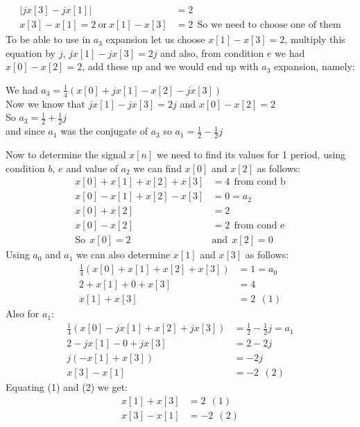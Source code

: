 \documentclass[10pt,a4paper, margin=1in]{article}
\begin{document}
\begin{enumerate}
\begin{align*}
			|jx[3] - jx[1]| &= 2 \\
			x[3] - x[1] = 2 \ \text{or} \ x[1] - x[3] &= 2 \ \ \text{So we need to choose one of them}
		\end{align*}
		To be able to use in $a_3$ expansion let us choose $x[1] - x[3] = 2$, multiply this equation by $j$, $jx[1] - jx[3] = 2j$ and also, from condition $e$ we had $x[0]-x[2]=2$, add these up and we would end up with $a_3$ expansion, namely:
		\begin{center}
			We had $a_3 = \frac{1}{4}(x[0] + jx[1] - x[2] - jx[3])$ \\
			Now we know that $jx[1] - jx[3] = 2j$ and $x[0]-x[2]=2$ \\
			So $a_3 = \frac{1}{2} + \frac{1}{2}j$ \\
			and since $a_1$ was the conjugate of $a_3$ so $a_1 = \frac{1}{2} - \frac{1}{2}j$ \\
		\end{center}
		Now to determine the signal $x[n]$ we need to find its values for 1 period, using condition $b$, $e$ and value of $a_2$ we can find $x[0]$ and $x[2]$ as follows:
		\begin{align*}
		x[0] + x[1] + x[2] + x[3] &= 4 \ \ \text{from cond b}\\
		x[0] - x[1] + x[2] - x[3] &= 0 = a_2\\
		x[0] + x[2] &= 2 \\
		x[0] - x[2] &= 2 \ \ \text{from cond e} \\
		\text{So} \ \ x[0] = 2 \ \ &\text{and} \ \ x[2] = 0
		\end{align*}
		Using $a_0$ and $a_1$ we can also determine $x[1]$ and $x[3]$ as follows:
		\begin{align*}
		\frac{1}{4}(x[0] + x[1] + x[2] + x[3]) &= 1 = a_0\\
		2 + x[1] + 0 + x[3] &= 4\\
		x[1] + x[3] &= 2 \ \ (1)
		\end{align*}
		Also for $a_1$:
		\begin{align*}
		\frac{1}{4}(x[0] - jx[1] + x[2] + jx[3]) &= \frac{1}{2}-\frac{1}{2}j = a_1\\
		2 - jx[1] - 0 + jx[3] &= 2-2j\\
		j(-x[1] + x[3]) &= -2j\\
		x[3] - x[1] &= -2 \ \ (2)
		\end{align*}
		Equating (1) and (2) we get:
		\begin{align*}
		x[1] + x[3] &= 2 \ \ (1) \\
		x[3] - x[1] &= -2 \ \ (2) \\

\end{align*}
\end{enumerate}
\end{document}
